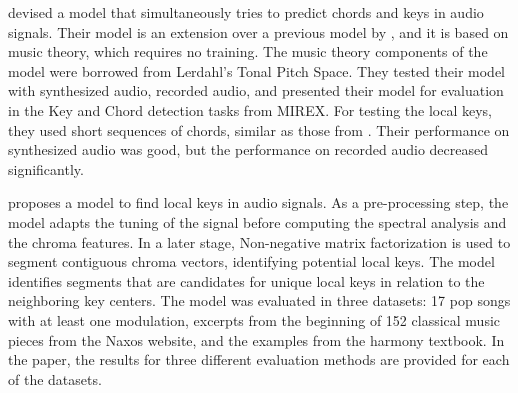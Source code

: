 


\textcite{catteau2007probabilistic} devised a model that
simultaneously tries to predict chords and keys in audio
signals. Their model is an extension over a previous model
by \textcite{bello2005robust}, and it is based on music
theory, which requires no training. The music theory
components of the model were borrowed from Lerdahl's Tonal
Pitch Space. They tested their model with synthesized audio,
recorded audio, and presented their model for evaluation in
the Key and Chord detection tasks from MIREX. For testing
the local keys, they used short sequences of chords, similar
as those from \textcite{krumhansl1982tracing}. Their
performance on synthesized audio was good, but the
performance on recorded audio decreased significantly.



\textcite{izmirli2007localized} proposes a model to find
local keys in audio signals. As a pre-processing step, the
model adapts the tuning of the signal before computing the
spectral analysis and the chroma features. In a later stage,
Non-negative matrix factorization is used to segment
contiguous chroma vectors, identifying potential local keys.
The model identifies segments that are candidates for unique
local keys in relation to the neighboring key centers. The
model was evaluated in three datasets: 17 pop songs with at
least one modulation, excerpts from the beginning of 152
classical music pieces from the Naxos website, and the
examples from the \textcite{kostka1984tonal} harmony
textbook. In the paper, the results for three different
evaluation methods are provided for each of the datasets.

